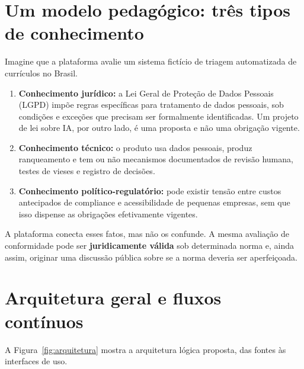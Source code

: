 \documentclass[12pt,a4paper,oneside,english,brazil]{abntex2}
\begin{document}
\chapter{Um modelo pedagógico: três tipos de conhecimento}
Imagine que a plataforma avalie um sistema fictício de triagem automatizada de currículos no Brasil.
\begin{enumerate}
\item \textbf{Conhecimento jurídico:} a Lei Geral de Proteção de Dados Pessoais (LGPD) impõe regras específicas para tratamento de dados pessoais, sob condições e exceções que precisam ser formalmente identificadas. Um projeto de lei sobre IA, por outro lado, é uma proposta e não uma obrigação vigente.
\item \textbf{Conhecimento técnico:} o produto usa dados pessoais, produz ranqueamento e tem ou não mecanismos documentados de revisão humana, testes de vieses e registro de decisões.
\item \textbf{Conhecimento político-regulatório:} pode existir tensão entre custos antecipados de compliance e acessibilidade de pequenas empresas, sem que isso dispense as obrigações efetivamente vigentes.
\end{enumerate}
A plataforma conecta esses fatos, mas não os confunde. A mesma avaliação de conformidade pode ser \textbf{juridicamente válida} sob determinada norma e, ainda assim, originar uma discussão pública sobre se a norma deveria ser aperfeiçoada.

\chapter{Arquitetura geral e fluxos contínuos}
A Figura~\ref{fig:arquitetura} mostra a arquitetura lógica proposta, das fontes às interfaces de uso.
\end{document}
